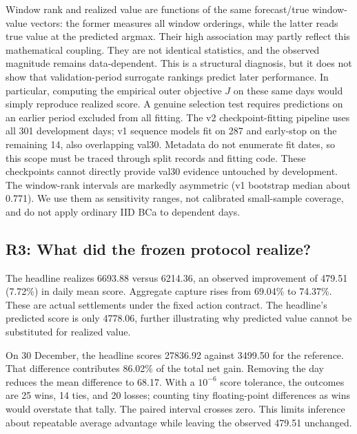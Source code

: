 \documentclass[11pt,a4paper]{article}
\begin{document}
Window rank and realized value are functions of the same forecast/true window-value vectors: the former measures all window orderings, while the latter reads true value at the predicted argmax. Their high association may partly reflect this mathematical coupling. They are not identical statistics, and the observed magnitude remains data-dependent. This is a structural diagnosis, but it does not show that validation-period surrogate rankings predict later performance. In particular, computing the empirical outer objective $J$ on these same days would simply reproduce realized score. A genuine selection test requires predictions on an earlier period excluded from all fitting. The v2 checkpoint-fitting pipeline uses all 301 development days; v1 sequence models fit on 287 and early-stop on the remaining 14, also overlapping val30. Metadata do not enumerate fit dates, so this scope must be traced through split records and fitting code. These checkpoints cannot directly provide val30 evidence untouched by development. The window-rank intervals are markedly asymmetric (v1 bootstrap median about 0.771). We use them as sensitivity ranges, not calibrated small-sample coverage, and do not apply ordinary IID BCa to dependent days.

\FloatBarrier
\subsection{R3: What did the frozen protocol realize?}

The headline realizes 6693.88 versus 6214.36, an observed improvement of 479.51 (7.72\%) in daily mean score. Aggregate capture rises from 69.04\% to 74.37\%. These are actual settlements under the fixed action contract. The headline's predicted score is only 4778.06, further illustrating why predicted value cannot be substituted for realized value.


On 30 December, the headline scores 27836.92 against 3499.50 for the reference. That difference contributes 86.02\% of the total net gain. Removing the day reduces the mean difference to 68.17. With a $10^{-6}$ score tolerance, the outcomes are 25 wins, 14 ties, and 20 losses; counting tiny floating-point differences as wins would overstate that tally. The paired interval crosses zero. This limits inference about repeatable average advantage while leaving the observed 479.51 unchanged.
\end{document}
